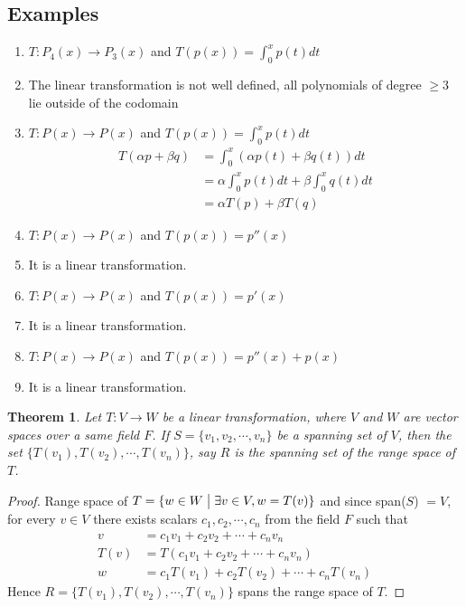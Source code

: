 \documentclass[a4paper, titlepage]{article}
\newtheorem{theorem}{Theorem}[section]
\begin{document}
    \subsection{Examples}
        \begin{enumerate}[label=\textbf{\arabic*}]
            \item $T: P_4(x) \rightarrow P_3(x)$ and 
            $T\left(p(x)\right) = \displaystyle\int_0^x p(t) dt$
            \item[] The linear transformation is not well defined, all
            polynomials of degree $\ge 3$ lie outside of the codomain
            \item $T: P(x) \rightarrow P(x)$ and 
            $T\left(p(x)\right) = \displaystyle\int_0^x p(t) dt$
            \begin{align*}
                T(\alpha p + \beta q) &= \displaystyle\int_0^x \left(\alpha p(t) + \beta q(t)\right) dt \\
                                    &= \alpha\displaystyle\int_0^x p(t) dt + \beta\displaystyle\int_0^x q(t) dt \\
                                    &= \alpha T(p) + \beta T(q)
            \end{align*}
            \item $T: P(x) \rightarrow P(x)$ and 
            $T\left(p(x)\right) = p''(x)$
            \item[] It is a linear transformation.
            \item $T: P(x) \rightarrow P(x)$ and 
            $T\left(p(x)\right) = p'(x)$
            \item[] It is a linear transformation. 
            \item $T: P(x) \rightarrow P(x)$ and 
            $T\left(p(x)\right) = p''(x) + p(x)$
            \item[] It is a linear transformation. 
        \end{enumerate}
        \begin{theorem}
            Let $T: V \rightarrow W$ be a linear transformation, where
            $V$ and $W$ are vector spaces over a same field $F$. If $S =
            \{ v_1, v_2, \cdots, v_n \}$ be a spanning set of $V$, then the
            set $\{ T(v_1), T(v_2), \cdots, T(v_n) \}$, say $R$ is the
            spanning set of the range space of $T$.
        \end{theorem}
        \begin{proof}
            Range space of $T = \{ w \in W\bigm\vert \exists v \in V, w = 
            T(v) \}$ and since span($S$) $= V$, for every $v 
            \in V$ there exists scalars $c_1, c_2, \cdots, c_n$ from 
            the field $F$ such that 
            \begin{align*}
                v    &= c_1v_1 + c_2v_2 + \cdots + c_nv_n \\
                T(v) &= T(c_1v_1 + c_2v_2 + \cdots + c_nv_n) \\
                w    &= c_1T(v_1) + c_2T(v_2) + \cdots + c_nT(v_n)
            \end{align*}
            Hence $R = \{ T(v_1), T(v_2), \cdots, T(v_n) \}$ spans the
            range space of $T$.
        \end{proof}
\end{document}
